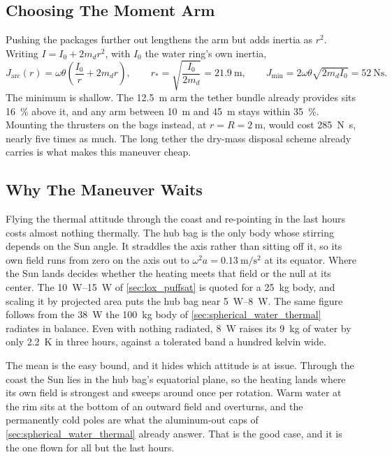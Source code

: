 \documentclass{article}
\begin{document}
\subsection*{Choosing The Moment Arm}
Pushing the packages further out lengthens the arm but adds inertia as \(r^{2}\). Writing \(I = I_0 + 2 m_d r^{2}\), with \(I_0\) the water ring's own inertia,
\begin{equation}
J_{\mathrm{arc}}(r) = \omega\theta\left(\frac{I_0}{r} + 2 m_d r\right),
\qquad
r_{*} = \sqrt{\frac{I_0}{2 m_d}} = \SI{21.9}{\meter},
\qquad
J_{\min} = 2\omega\theta\sqrt{2 m_d I_0} = \SI{52}{\newton\second}.
\label{eq:reorient_optimum}
\end{equation}
The minimum is shallow. The \SI{12.5}{\meter} arm the tether bundle already provides sits \SI{16}{\percent} above it, and any arm between \SI{10}{\meter} and \SI{45}{\meter} stays within \SI{35}{\percent}. Mounting the thrusters on the bags instead, at \(r = R = \SI{2}{\meter}\), would cost \SI{285}{\newton\second}, nearly five times as much. The long tether the dry-mass disposal scheme already carries is what makes this maneuver cheap.

\subsection*{Why The Maneuver Waits}
Flying the thermal attitude through the coast and re-pointing in the last hours costs almost nothing thermally. The hub bag is the only body whose stirring depends on the Sun angle. It straddles the axis rather than sitting off it, so its own field runs from zero on the axis out to \(\omega^{2}a = \SI{0.13}{\meter\per\second\squared}\) at its equator. Where the Sun lands decides whether the heating meets that field or the null at its center. The \SIrange{10}{15}{\watt} of \autoref{sec:lox_puffsat} is quoted for a \SI{25}{\kilo\gram} body, and scaling it by projected area puts the hub bag near \SIrange{5}{8}{\watt}. The same figure follows from the \SI{38}{\watt} the \SI{100}{\kilo\gram} body of \autoref{sec:spherical_water_thermal} radiates in balance. Even with nothing radiated, \SI{8}{\watt} raises its \SI{9}{\kilo\gram} of water by only \SI{2.2}{\kelvin} in three hours, against a tolerated band a hundred kelvin wide.

The mean is the easy bound, and it hides which attitude is at issue. Through the coast the Sun lies in the hub bag's equatorial plane, so the heating lands where its own field is strongest and sweeps around once per rotation. Warm water at the rim sits at the bottom of an outward field and overturns, and the permanently cold poles are what the aluminum-out caps of \autoref{sec:spherical_water_thermal} already answer. That is the good case, and it is the one flown for all but the last hours.
\end{document}
